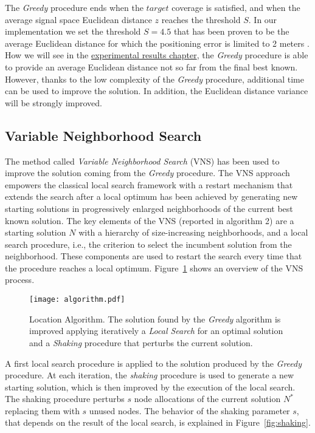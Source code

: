 The \emph{Greedy} procedure ends when the $target$ coverage is satisfied, and when the average signal space Euclidean distance $z$ reaches the threshold $S$. In our implementation we set the threshold $S=4.5$ that has been proven to be the average Euclidean distance for which the positioning error is limited to 2 meters \cite{He2011}.
How we will see in the {\hyperref[cap:results]{experimental results chapter}}, the \emph{Greedy} procedure is able to provide an average Euclidean distance not so far from the final best known. However, thanks to the low complexity of the \emph{Greedy} procedure, additional time can be used to improve the solution. In addition, the Euclidean distance variance will be strongly improved.

\subsection{Variable Neighborhood Search}
The method called \emph{Variable Neighborhood Search} (VNS) has been used to improve the solution coming from the \emph{Greedy} procedure. The VNS approach empowers the classical local search framework with a restart mechanism that extends the search after a local optimum has been achieved by generating new starting solutions in progressively enlarged neighborhoods of the current best known solution. The key elements of the VNS (reported in algorithm 2) are a starting solution $N$ with a hierarchy of size-increasing neighborhoods, and a local search procedure, i.e., the criterion to select the incumbent solution from the neighborhood. These components are used to restart the search every time that the procedure reaches a local optimum.
Figure~\ref{fig:algorithm} shows an overview of the VNS process. 
\begin{figure}[h!tb]
\centering\texttt{[image: algorithm.pdf]}
\caption{Location Algorithm. The solution found by the \emph{Greedy} algorithm is improved applying iteratively a \emph{Local Search} for an optimal solution and a \emph{Shaking} procedure that perturbs the current solution.}
\label{fig:algorithm}
\end{figure}
A first local search procedure is applied to the solution produced by the \emph{Greedy} procedure. At each iteration, the \emph{shaking} procedure is used to generate a new starting solution, which is then improved by the execution of the local search. The shaking procedure perturbs \(s\) node allocations of the current solution \(N^*\) replacing them with \(s\) unused nodes. The behavior of the shaking parameter \(s\), that depends on the result of the local search, is explained in Figure~\ref{fig:shaking}. 
